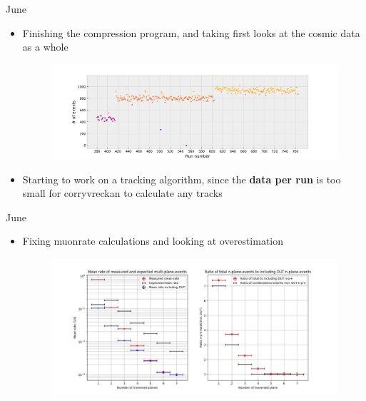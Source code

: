 \documentclass{beamer}
\begin{document}
\begin{frame}{June}
    \begin{itemize}
	\item Finishing the compression program, and taking first looks at the
	    cosmic data as a whole
	    \begin{figure}[H]
		\centering
		\includegraphics[width=.9\textwidth]{MauriceFirstLookCosmics.png}
	    \end{figure}
	\item Starting to work on a tracking algorithm, since the \textbf{data per run} 
	    is too small for corryvreckan to calculate any tracks
    \end{itemize}
\end{frame}

\begin{frame}{June}
    \begin{itemize}
	\item Fixing muonrate calculations and looking at overestimation
	    \begin{figure}[H]
		\centering
		\includegraphics[width=.9\textwidth]{DavidOverestimation.jpg}
	    \end{figure}
    \end{itemize}
\end{frame}
\end{document}
